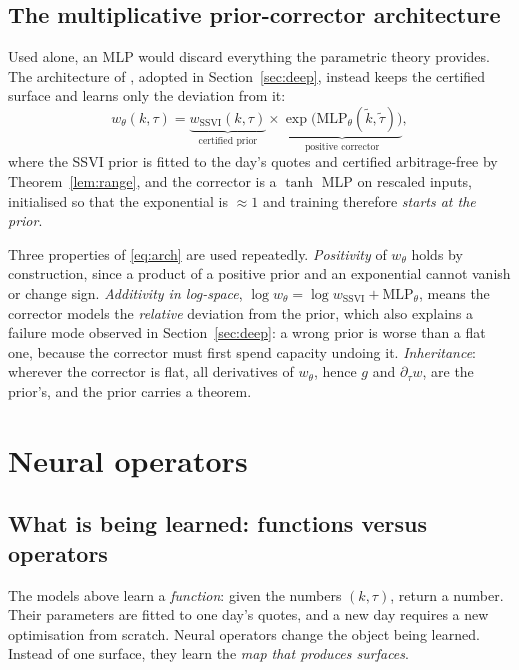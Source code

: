 \subsection{The multiplicative prior-corrector architecture}

Used alone, an MLP would discard everything the parametric theory provides. The architecture of
\cite{ackerer2020}, adopted in Section~\ref{sec:deep}, instead keeps the certified surface and
learns only the deviation from it:
\begin{equation}\label{eq:arch}
w_\theta(k,\tau)=\underbrace{w_{\mathrm{SSVI}}(k,\tau)}_{\text{certified prior}}\times
\underbrace{\exp\bigl(\mathrm{MLP}_\theta(\tilde k,\tilde\tau)\bigr)}_{\text{positive corrector}},
\end{equation}
where the SSVI prior is fitted to the day's quotes and certified arbitrage-free by
Theorem~\ref{lem:range}, and the corrector is a $\tanh$ MLP on rescaled inputs, initialised so
that the exponential is $\approx1$ and training therefore \emph{starts at the prior}.

Three properties of \eqref{eq:arch} are used repeatedly. \emph{Positivity} of $w_\theta$ holds by
construction, since a product of a positive prior and an exponential cannot vanish or change
sign. \emph{Additivity in log-space}, $\log w_\theta=\log w_{\mathrm{SSVI}}+\mathrm{MLP}_\theta$,
means the corrector models the \emph{relative} deviation from the prior, which also explains a
failure mode observed in Section~\ref{sec:deep}: a wrong prior is worse than a flat one, because
the corrector must first spend capacity undoing it. \emph{Inheritance}: wherever the corrector is
flat, all derivatives of $w_\theta$, hence $g$ and $\partial_\tau w$, are the prior's, and the
prior carries a theorem.

\section{Neural operators}\label{sec:opsec}

\subsection{What is being learned: functions versus operators}

The models above learn a \emph{function}: given the numbers $(k,\tau)$, return a number. Their
parameters are fitted to one day's quotes, and a new day requires a new optimisation from
scratch. Neural operators change the object being learned. Instead of one surface, they learn the
\emph{map that produces surfaces}.

